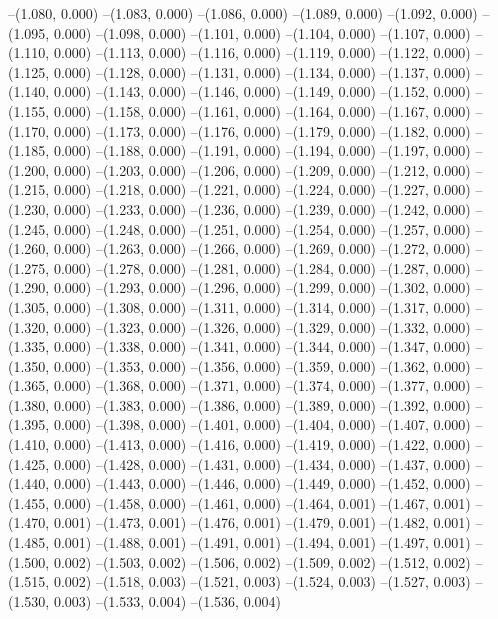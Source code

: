 --(1.080, 0.000)
--(1.083, 0.000)
--(1.086, 0.000)
--(1.089, 0.000)
--(1.092, 0.000)
--(1.095, 0.000)
--(1.098, 0.000)
--(1.101, 0.000)
--(1.104, 0.000)
--(1.107, 0.000)
--(1.110, 0.000)
--(1.113, 0.000)
--(1.116, 0.000)
--(1.119, 0.000)
--(1.122, 0.000)
--(1.125, 0.000)
--(1.128, 0.000)
--(1.131, 0.000)
--(1.134, 0.000)
--(1.137, 0.000)
--(1.140, 0.000)
--(1.143, 0.000)
--(1.146, 0.000)
--(1.149, 0.000)
--(1.152, 0.000)
--(1.155, 0.000)
--(1.158, 0.000)
--(1.161, 0.000)
--(1.164, 0.000)
--(1.167, 0.000)
--(1.170, 0.000)
--(1.173, 0.000)
--(1.176, 0.000)
--(1.179, 0.000)
--(1.182, 0.000)
--(1.185, 0.000)
--(1.188, 0.000)
--(1.191, 0.000)
--(1.194, 0.000)
--(1.197, 0.000)
--(1.200, 0.000)
--(1.203, 0.000)
--(1.206, 0.000)
--(1.209, 0.000)
--(1.212, 0.000)
--(1.215, 0.000)
--(1.218, 0.000)
--(1.221, 0.000)
--(1.224, 0.000)
--(1.227, 0.000)
--(1.230, 0.000)
--(1.233, 0.000)
--(1.236, 0.000)
--(1.239, 0.000)
--(1.242, 0.000)
--(1.245, 0.000)
--(1.248, 0.000)
--(1.251, 0.000)
--(1.254, 0.000)
--(1.257, 0.000)
--(1.260, 0.000)
--(1.263, 0.000)
--(1.266, 0.000)
--(1.269, 0.000)
--(1.272, 0.000)
--(1.275, 0.000)
--(1.278, 0.000)
--(1.281, 0.000)
--(1.284, 0.000)
--(1.287, 0.000)
--(1.290, 0.000)
--(1.293, 0.000)
--(1.296, 0.000)
--(1.299, 0.000)
--(1.302, 0.000)
--(1.305, 0.000)
--(1.308, 0.000)
--(1.311, 0.000)
--(1.314, 0.000)
--(1.317, 0.000)
--(1.320, 0.000)
--(1.323, 0.000)
--(1.326, 0.000)
--(1.329, 0.000)
--(1.332, 0.000)
--(1.335, 0.000)
--(1.338, 0.000)
--(1.341, 0.000)
--(1.344, 0.000)
--(1.347, 0.000)
--(1.350, 0.000)
--(1.353, 0.000)
--(1.356, 0.000)
--(1.359, 0.000)
--(1.362, 0.000)
--(1.365, 0.000)
--(1.368, 0.000)
--(1.371, 0.000)
--(1.374, 0.000)
--(1.377, 0.000)
--(1.380, 0.000)
--(1.383, 0.000)
--(1.386, 0.000)
--(1.389, 0.000)
--(1.392, 0.000)
--(1.395, 0.000)
--(1.398, 0.000)
--(1.401, 0.000)
--(1.404, 0.000)
--(1.407, 0.000)
--(1.410, 0.000)
--(1.413, 0.000)
--(1.416, 0.000)
--(1.419, 0.000)
--(1.422, 0.000)
--(1.425, 0.000)
--(1.428, 0.000)
--(1.431, 0.000)
--(1.434, 0.000)
--(1.437, 0.000)
--(1.440, 0.000)
--(1.443, 0.000)
--(1.446, 0.000)
--(1.449, 0.000)
--(1.452, 0.000)
--(1.455, 0.000)
--(1.458, 0.000)
--(1.461, 0.000)
--(1.464, 0.001)
--(1.467, 0.001)
--(1.470, 0.001)
--(1.473, 0.001)
--(1.476, 0.001)
--(1.479, 0.001)
--(1.482, 0.001)
--(1.485, 0.001)
--(1.488, 0.001)
--(1.491, 0.001)
--(1.494, 0.001)
--(1.497, 0.001)
--(1.500, 0.002)
--(1.503, 0.002)
--(1.506, 0.002)
--(1.509, 0.002)
--(1.512, 0.002)
--(1.515, 0.002)
--(1.518, 0.003)
--(1.521, 0.003)
--(1.524, 0.003)
--(1.527, 0.003)
--(1.530, 0.003)
--(1.533, 0.004)
--(1.536, 0.004)
